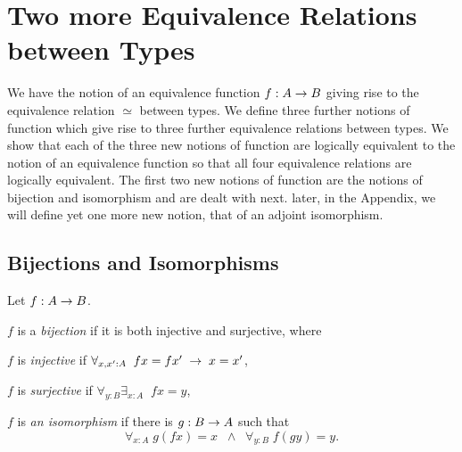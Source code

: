
\section{Two more Equivalence Relations between Types}

We have the notion of an equivalence function $f:A\rightarrow B$ giving rise to the equivalence relation $\simeq$ between types.  We define three further notions of function which give rise to three further equivalence relations between types.  We show that each of the three new notions of function are logically equivalent to the notion of an equivalence function so that all four equivalence relations are logically equivalent.  The first two new notions of function are the notions of bijection and isomorphism and are dealt with next.  later, in the Appendix, we will define yet one more new notion, that of an adjoint isomorphism.

\subsection{Bijections and Isomorphisms}

Let $f:A\rightarrow B$.
\item $f$ is a {\em bijection} if it is both injective and surjective, where
\item $f$ is {\em injective} if $\forall_{x,x':A}\; \; fx=fx'\;\rightarrow\; x=x'$,
\item $f$ is {\em surjective} if $\forall_{y:B}\exists_{x:A}\;\; fx=y$,
\item $f$ is {\em an isomorphism} if there is $g:B\rightarrow A$ such that 
  \[\forall_{x:A}\; g(fx)=x\;\;\wedge\;\;\forall_{y:B}\; f(gy)=y.\]

